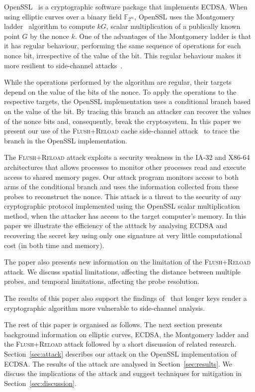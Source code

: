 \documentclass{llncs}
\begin{document}
OpenSSL~\cite{openssl} is a cryptographic software package that implements ECDSA.
When using elliptic curves over a binary field $\mathbb{F}_{2^m}$, OpenSSL uses the 
Montgomery ladder~\cite{montgomery87speeding,joye03montgomery} algorithm to compute $kG$, scalar multiplication of a publically known point $G$ by the nonce $k$.
One of the advantages of the Montgomery ladder is that it has regular behaviour, performing
the same sequence of operations for each nonce bit, irrespective of the value of the bit.
This regular behaviour makes it more resilient to side-channel attacks~\cite{joye03montgomery,okeya00elliptic}.

While the operations performed by the algorithm are regular, their targets depend on the value of the bits of the nonce.
To apply the operations to the respective targets, the OpenSSL implementation uses a conditional branch based on the value of the bit. By tracing this branch an attacker can recover the values of the nonce bits and, consequently, break the cryptosystem. In this paper we present our use of the \textsc{Flush+Reload} cache side-channel attack~\cite{yarom13flush} to trace the branch in the OpenSSL implementation.

The \textsc{Flush+Reload} attack exploits a security weakness in the IA-32 and X86-64 architectures that allows processes
to monitor other processes read and execute access to shared memory pages.
Our attack program monitors access to both arms of the conditional branch and uses the information
collected from these probes to reconstruct the nonce. This attack is a threat to the security of any cryptographic protocol implemented using the OpenSSL scalar multiplication method, when the attacker has access to the target computer's memory. In this paper we illustrate the efficiency of the atttack by analysing ECDSA and recovering the secret key using only one signature at very little computational cost (in both time and memory).

The paper also presents new information on the limitation of the \textsc{Flush+Reload} attack.
We discuss spatial limitations, affecting the distance between multiple probes, and 
temporal limitations, affecting the probe resolution.

The results of this paper also support the findings of~\cite{walter04longer} that longer keys render a cryptographic algorithm more vulnerable to side-channel analysis.


The rest of this paper is organised as follows. The next section presents background information on elliptic curves, ECDSA, the Montgomery ladder and the \textsc{Flush+Reload} attack followed by a short discussion of related research.%
Section~\ref{sec:attack} describes our attack on the OpenSSL implementation of ECDSA.
The results of the attack are analysed in Section~\ref{sec:results}.
We discuss the implications of the attack and suggest techniques for mitigation in Section~\ref{sec:discussion}.
\end{document}

